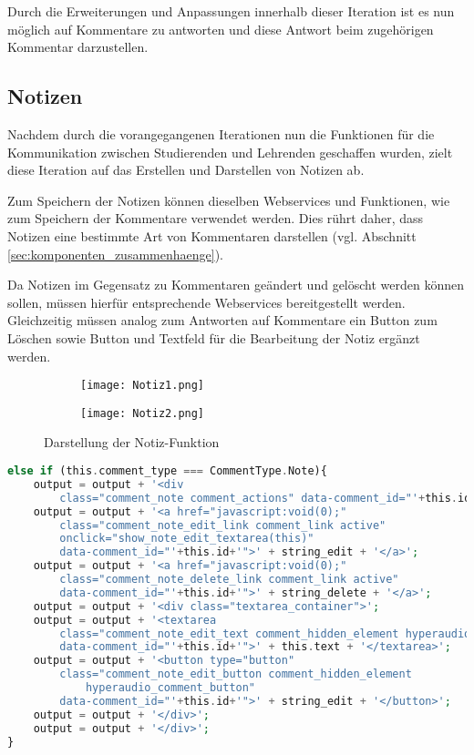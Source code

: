 Durch die Erweiterungen und Anpassungen innerhalb dieser Iteration ist es nun möglich auf Kommentare zu antworten und diese Antwort beim zugehörigen Kommentar darzustellen.

\subsection{Notizen}
\label{sub:notizen}
Nachdem durch die vorangegangenen Iterationen nun die Funktionen für die Kommunikation zwischen Studierenden und Lehrenden geschaffen wurden, zielt diese Iteration auf das Erstellen und Darstellen von Notizen ab.

Zum Speichern der Notizen können dieselben Webservices und Funktionen, wie zum Speichern der Kommentare verwendet werden. Dies rührt daher, dass Notizen eine bestimmte Art von Kommentaren darstellen (vgl. Abschnitt \ref{sec:komponenten_zusammenhaenge}). 

Da Notizen im Gegensatz zu Kommentaren geändert und gelöscht werden können sollen, müssen hierfür entsprechende Webservices bereitgestellt werden. Gleichzeitig müssen analog zum Antworten auf Kommentare ein Button zum Löschen sowie Button und Textfeld für die Bearbeitung der Notiz ergänzt werden.

\begin{figure}[h!]
\begin{subfigure}[c]{0.5\textwidth}
\texttt{[image: Notiz1.png]}
\label{fig:Notiz1}
\end{subfigure}%
\begin{subfigure}[c]{0.5\textwidth}
\texttt{[image: Notiz2.png]}
\label{fig:Notiz2}
\end{subfigure}
\caption{Darstellung der Notiz-Funktion}
\label{fig:Notiz}
\end{figure}

\begin{lstlisting}[language=php,
             linewidth=\textwidth,
             caption={Ausschnitt der \textbf{hyperaudio.js} in der 6. Iteration},
             label={lst:it6:hyperaudio}]
else if (this.comment_type === CommentType.Note){
    output = output + '<div
        class="comment_note comment_actions" data-comment_id="'+this.id+'">';
    output = output + '<a href="javascript:void(0);"
        class="comment_note_edit_link comment_link active"
        onclick="show_note_edit_textarea(this)"
        data-comment_id="'+this.id+'">' + string_edit + '</a>';
    output = output + '<a href="javascript:void(0);"
        class="comment_note_delete_link comment_link active"
        data-comment_id="'+this.id+'">' + string_delete + '</a>';
    output = output + '<div class="textarea_container">';
    output = output + '<textarea
        class="comment_note_edit_text comment_hidden_element hyperaudio_textarea"
        data-comment_id="'+this.id+'">' + this.text + '</textarea>';
    output = output + '<button type="button"
        class="comment_note_edit_button comment_hidden_element
            hyperaudio_comment_button"
        data-comment_id="'+this.id+'">' + string_edit + '</button>';
    output = output + '</div>';
    output = output + '</div>';
}		
\end{lstlisting}

